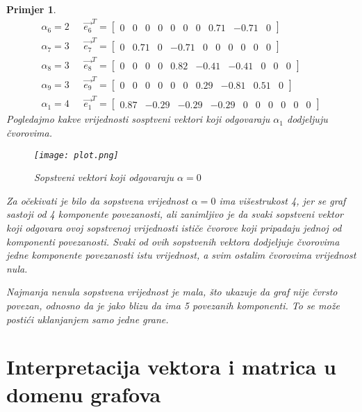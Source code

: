 \documentclass[11pt]{article}
\newtheorem{example}{Primjer}
\begin{document}
\begin{example}
\[\begin{split}
			\alpha_6=2 \text{  } & \vec{e_6}^T = \begin{bmatrix} 0  &  0  &  0  &  0  &  0  &  0  &  0  &  0.71  &  -0.71  &  0           \end{bmatrix} \\
			\alpha_7=3 \text{  } & \vec{e_7}^T = \begin{bmatrix} 0  &  0.71  &  0  &  -0.71  &  0  &  0  &  0  &  0  &  0  &  0           \end{bmatrix} \\
			\alpha_8=3 \text{  } & \vec{e_8}^T = \begin{bmatrix} 0  &  0  &  0  &  0  &  0.82  &  -0.41  &  -0.41  &  0  &  0  &  0       \end{bmatrix} \\
			\alpha_9=3 \text{  } & \vec{e_9}^T = \begin{bmatrix} 0  &  0  &  0  &  0  &  0  &  0  &  0.29  &  -0.81  &  0.51  &  0        \end{bmatrix} \\
			\alpha_1=4 \text{  } & \vec{e_1}^T = \begin{bmatrix} 0.87  &  -0.29  &  -0.29  &  -0.29  &  0  &  0  &  0  &  0  &  0  &  0  \end{bmatrix}
		\end{split}
		\]
		Pogledajmo kakve vrijednosti sosptveni vektori koji odgovaraju $\alpha_1$ dodjeljuju čvorovima. 
		\begin{figure}[h]
			\centering
			\texttt{[image: plot.png]}
			\caption{Sopstveni vektori koji odgovaraju $\alpha = 0$}
		\end{figure}
		
		Za očekivati je bilo da sopstvena vrijednost $\alpha = 0$ ima višestrukost 4, jer se graf sastoji od 4 komponente povezanosti, ali zanimljivo je
		da svaki sopstveni vektor koji odgovara ovoj sopstvenoj vrijednosti ističe čvorove koji pripadaju jednoj od komponenti povezanosti.
		Svaki od ovih sopstvenih vektora dodjeljuje čvorovima jedne komponente povezanosti istu vrijednost, a svim ostalim čvorovima vrijednost nula. 
		
		Najmanja nenula sopstvena vrijednost je mala, što ukazuje da graf nije čvrsto povezan, odnosno da je
        jako blizu da ima 5 povezanih komponenti. To se može postići uklanjanjem samo jedne grane.
	\end{example}

	\section{Interpretacija vektora i matrica u domenu grafova}
\end{document}
